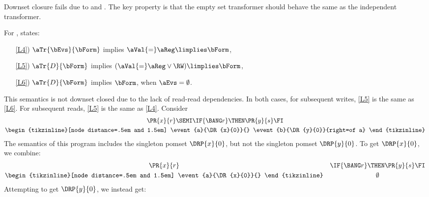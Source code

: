 Downset closure fails due to \xRRD{} and \xLIR{}.  The key property is that
the empty set transformer should behave the same as the independent
transformer.

\begin{example}
  For \xRRD{},  states:
  \begin{enumerate}
  \item[\ref{L4})]
    $\aTr{\bEvs}{\bForm}$ implies $\aVal{=}\aReg\limplies\bForm$, 
  \item[\ref{L5})]
    $\aTr{\cEvs}{\bForm}$ implies $(\aVal{=}\aReg\lor\RW)\limplies\bForm$,
  \item[\ref{L6})] 
    $\aTr{\dEvs}{\bForm}$ implies $\bForm$, when $\aEvs=\emptyset$.
  \end{enumerate}
  This semantics is not downset closed due to the lack of read-read dependencies.
  In both cases, for subsequent writes, \ref{L5} is the same as \ref{L6}.  For
  subsequent reads, \ref{L5} is the same as \ref{L4}.
  Consider
  \begin{gather*}
    \begin{gathered}[t]
      \PR{x}{r}\SEMI\IF{\BANG r}\THEN\PR{y}{s}\FI
      \\
      \hbox{\begin{tikzinline}[node distance=.5em and 1.5em]
          \event{a}{\DR{x}{0}}{}
          \event{b}{\DR{y}{0}}{right=of a}
        \end{tikzinline}}
    \end{gathered}    
  \end{gather*}
  The semantics of this program includes the singleton pomset $\DRP{x}{0}$,
  but not the singleton pomset $\DRP{y}{0}$.
  To get $\DRP{x}{0}$, we combine:
  \begin{align*}
    \begin{gathered}[t]
      \PR{x}{r}
      \\
      \hbox{\begin{tikzinline}[node distance=.5em and 1.5em]
          \event{a}{\DR{x}{0}}{}
        \end{tikzinline}}
    \end{gathered}    
    &&
    \begin{gathered}[t]
      \IF{\BANG r}\THEN\PR{y}{s}\FI
      \\
      \emptyset
    \end{gathered}    
  \end{align*}
  Attempting to get $\DRP{y}{0}$, we instead get:
  \begin{align*}

\end{align*}
\end{example}
